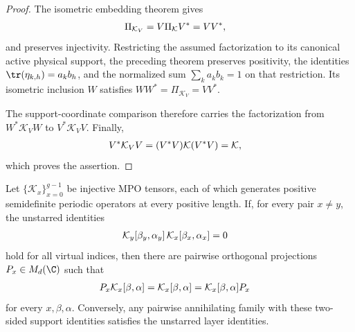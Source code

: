 \begin{proof}
    \leanok
    The isometric embedding theorem gives
    \begin{align}
        \Pi_{\mathcal K_V}
         & =V\Pi_{\mathcal K}V^*=VV^*,
        \notag
    \end{align}
    and preserves injectivity. Restricting the assumed factorization to its
    canonical active physical support, the preceding theorem preserves
    positivity, the identities $\tr(\eta_{k,h})=a_kb_h$, and the normalized
    sum $\sum_k a_kb_k=1$ on that restriction. Its isometric inclusion $W$
    satisfies $WW^*=\Pi_{\mathcal K_V}=VV^*$.

    The support-coordinate comparison therefore carries the factorization
    from $W^*\mathcal K_VW$ to $V^*\mathcal K_VV$. Finally,
    \begin{align}
        V^*\mathcal K_VV
         & =(V^*V)\mathcal K(V^*V)=\mathcal K,
        \notag
    \end{align}
    which proves the assertion.
\end{proof}

\begin{lemma}
    \label{thm:mpdo_bnt_layer_orthogonal_supports}
    \leanok
    Let $\{\mathcal K_x\}_{x=0}^{g-1}$ be injective MPO tensors, each of which
    generates positive semidefinite periodic operators at every positive
    length. If, for every pair $x\ne y$, the unstarred identities
    \begin{align}
        \mathcal K_y[\beta_y,\alpha_y]\,
        \mathcal K_x[\beta_x,\alpha_x] & =0
        \notag
    \end{align}
    hold for all virtual indices, then there are pairwise orthogonal
    projections $P_x\in M_d(\C)$ such that
    \begin{align}
        P_x\mathcal K_x[\beta,\alpha]
         & =\mathcal K_x[\beta,\alpha]
        =\mathcal K_x[\beta,\alpha]P_x
        \notag
    \end{align}
    for every $x,\beta,\alpha$. Conversely, any pairwise annihilating family
    with these two-sided support identities satisfies the unstarred layer
    identities.
\end{lemma}

